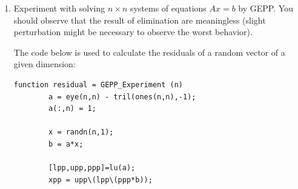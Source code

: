 \documentclass[12pt,letterpaper,reqno]{amsart}
\begin{document}
\begin{enumerate}
\begin{enumerate}
    \item Experiment with solving $n \times n$ systems of equations $Ax = b$ by GEPP. You should observe that the result of elimination are meaningless (slight perturbation might be necessary to observe the worst behavior).\newline
    \begin{flushleft}
    The code below is used to calculate the residuals of a random vector of a given dimension:
    \end{flushleft}
    \begin{lstlisting}[mathescape=true]
    function residual = GEPP_Experiment (n)
        a = eye(n,n) - tril(ones(n,n),-1);
        a(:,n) = 1;
        
        x = randn(n,1);
        b = a*x;
        
        [lpp,upp,ppp]=lu(a);
        xpp = upp\(lpp\(ppp*b));
        

\end{lstlisting}
\end{enumerate}
\end{enumerate}
\end{document}

